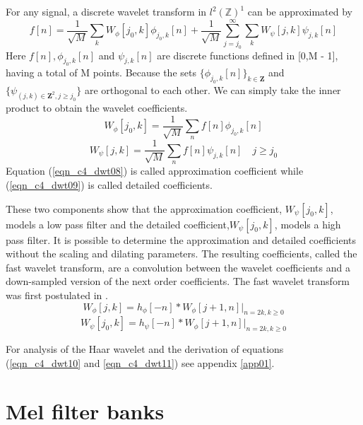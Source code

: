 For any signal, a discrete wavelet transform in $l^2(\mathbb{Z})^1$ can be approximated by
\begin{equation}
f[n]=\frac{1}{\sqrt{M}}\sum_kW_\phi[j_0,k]\phi_{j_0,k}[n]+\frac{1}{\sqrt{M}}\sum_{j=j_0}^\infty\sum_kW_\psi[j,k]\psi_{j,k}[n]
\label{eqn_c4_dwt07}
\end{equation}
Here $f[n],\phi_{j_0,k}[n]$ and $\psi_{j,k}[n]$ are discrete functions defined in [0,M - 1], having a total of M points.  Because the sets $\{\phi_{j_0,k}[n]\}_{k\in\mathbf{Z}}$ and $\{\psi_{(j,k)\in\mathbf{Z}^2,j\ge j_0}\}$ are orthogonal to each other.  We can simply take the inner product to obtain the wavelet coefficients.
\begin{equation}
W_\phi[j_0,k]=\frac{1}{\sqrt{M}}\sum_nf[n]\phi_{j_0,k}[n]
\label{eqn_c4_dwt08}
\end{equation}
\begin{equation}
W_\psi[j,k]=\frac{1}{\sqrt{M}}\sum_nf[n]\psi_{j,k}[n] \quad j\ge j_0
\label{eqn_c4_dwt09}
\end{equation}
Equation (\ref{eqn_c4_dwt08}) is called approximation coefficient while (\ref{eqn_c4_dwt09}) is called detailed coefficients.

These two components show that the approximation coefficient, $W_\psi[j_0,k]$, models a low pass filter and the detailed coefficient,$W_\psi[j_0,k]$, models a high pass filter. It is possible to determine the approximation and detailed coefficients without the scaling and dilating parameters. The resulting coefficients, called the fast wavelet transform, are a convolution between the wavelet coefficients and a down-sampled version of the next order coefficients.  The fast wavelet transform was first postulated in \citep{mallat1989theory}.
\begin{equation}
W_\phi[j,k]=h_\phi[-n]\ast W_\phi[j+1,n]|_{n=2k, k\ge 0}
\label{eqn_c4_dwt10}
\end{equation}
\begin{equation}
W_\psi[j_0,k]=h_\psi[-n]\ast W_\phi[j+1,n]|_{n=2k, k\ge 0}
\label{eqn_c4_dwt11}
\end{equation}

For analysis of the Haar wavelet and the derivation of equations (\ref{eqn_c4_dwt10} and \ref{eqn_c4_dwt11}) see appendix \ref{app01}.

\section{Mel filter banks}

